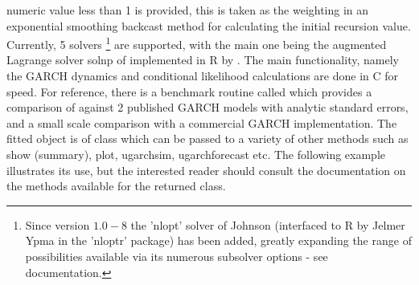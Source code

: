 numeric value less than 1 is provided, this is taken as the weighting in an
exponential smoothing backcast method for calculating the initial recursion value.\\
Currently, 5 solvers \footnote{Since version $1.0-8$ the
'nlopt' solver of Johnson (interfaced to R by Jelmer Ypma in the 'nloptr' package)
has  been added, greatly expanding the range of possibilities available via its
numerous subsolver options - see documentation.} are supported, with the main
one being the augmented Lagrange solver solnp of \cite{Ye1997} implemented in R by
\cite{Ghalanos2011}.
The main functionality, namely the GARCH dynamics and conditional likelihood calculations are
done in C for speed. For reference, there is a benchmark routine called \verb@ugarchbench@
which provides a comparison of \verb@rugarch@ against 2 published GARCH models with analytic
standard errors, and a small scale comparison with a commercial GARCH implementation.
The fitted object is of class \verb@uGARCHfit@ which can be passed to a variety
of other methods such as show (summary), plot, ugarchsim, ugarchforecast etc.
The following example illustrates its use, but the interested reader should
consult the documentation on the methods available for the returned class.
